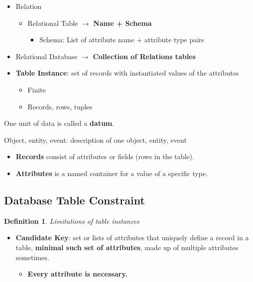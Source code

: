 \documentclass[twoside]{article}
\newtheorem{definition}[theorem]{Definition}
\begin{document}
\begin{itemize}
    \item Relation
    \begin{itemize}
        \item Relational Table $\longrightarrow$ \textbf{Name + Schema}
        \begin{itemize}
            \item Schema: List of attribute name + attribute type pairs
        \end{itemize}
    \end{itemize}
    \item Relational Database $\longrightarrow$ \textbf{Collection of Relations 
    tables}
    \item \textbf{Table Instance}: set of records with instantiated values of 
    the attributes
    \begin{itemize}
        \item Finite
        \item Records, rows, tuples
    \end{itemize}
\end{itemize}

One unit of data is called a \textbf{datum}.

Object, entity, event: description of one object, entity, event
\begin{itemize}
    \item \textbf{Records} consist of attributes or fields (rows in the 
    table).
    \item \textbf{Attributes} is a named container for a value of a specific type.
\end{itemize}

\subsection*{Database Table Constraint}
\begin{definition}
    Limitations of table instances
\end{definition}
\begin{itemize}
    \item \textbf{Candidate Key}: set or lists of attributes that uniquely
    define a record in a table, \textbf{minimal such set of attributes},
    made up of multiple attributes sometimes.
    \begin{itemize}
        \item \textbf{Every attribute is necessary.}
    \end{itemize}
\end{itemize}
\end{document}
